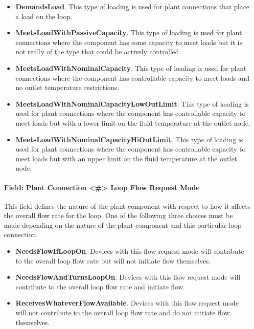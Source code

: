 \begin{itemize}
\item
  \textbf{DemandsLoad}. This type of loading is used for plant connections that place a load on the loop.
\item
  \textbf{MeetsLoadWithPassiveCapacity}. This type of loading is used for plant connections where the component has some capacity to meet loads but it is not really of the type that could be actively controlled.
\item
  \textbf{MeetsLoadWithNominalCapacity}. This type of loading is used for plant connections where the component has controllable capacity to meet loads and no outlet temperature restrictions.
\item
  \textbf{MeetsLoadWithNominalCapacityLowOutLimit}. This type of loading is used for plant connections where the component has controllable capacity to meet loads but with a lower limit on the fluid temperature at the outlet node.
\item
  \textbf{MeetsLoadWithNominalCapacityHiOutLimit}. This type of loading is used for plant connections where the component has controllable capacity to meet loads but with an upper limit on the fluid temperature at the outlet node.
\end{itemize}

\paragraph{Field: Plant Connection \textless{}\#\textgreater{} Loop Flow Request Mode}\label{field-plant-connection-x-loop-flow-request-mode}

This field defines the nature of the plant component with respect to how it affects the overall flow rate for the loop. One of the following three choices must be made depending on the nature of the plant component and this particular loop connection.

\begin{itemize}
\item
  \textbf{NeedsFlowIfLoopOn}. Devices with this flow request mode will contribute to the overall loop flow rate but will not initiate flow themselves.
\item
  \textbf{NeedsFlowAndTurnsLoopOn}. Devices with this flow request mode will contribute to the overall loop flow rate and initiate flow.
\item
  \textbf{ReceivesWhateverFlowAvailable}. Devices with this flow request mode will not contribute to the overall loop flow rate and do not initiate flow themselves.
\end{itemize}

